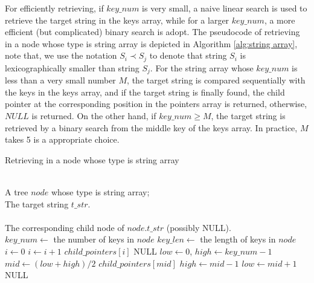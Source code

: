 \documentclass[legalpaper]{article}
\begin{document}
For efficiently retrieving, if $key\_num$ is very small, a naive
linear search is used to retrieve the target string in the keys array,
while for a larger $key\_num$, a more efficient (but complicated)
binary search is adopt.  The pseudocode of retrieving in a node whose
type is string array is depicted in Algorithm \ref{alg:string array},
note that, we use the notation $S_i \prec S_j$ to denote that string
$S_i$ is \textsf{lexicographically smaller} than string $S_j$. For the
string array whose $key\_num$ is less than a very small number $M$,
the target string is compared sequentially with the keys in the keys
array, and if the target string is finally found, the child pointer at
the corresponding position in the pointers array is returned,
otherwise, $NULL$ is returned. On the other hand, if $key\_num \geq
M$, the target string is retrieved by a binary search from the middle
key of the keys array. In practice, $M$ takes 5 is a appropriate
choice.

\begin{algorithm}
  \caption{Retrieving in a node whose type is string array}
  \label{alg:string array}
  \begin{algorithmic}[1]
    \REQUIRE ~~\\
    A tree $node$ whose type is string array; \\
    The target string $t\_str$.\\
    \ENSURE ~~\\
    The corresponding child node of $node.t\_str$ (possibly NULL).\\
    \STATE
    \STATE $key\_num \leftarrow$ the number of keys in $node$
    \STATE $key\_len \leftarrow$ the length of keys in $node$
    \STATE 
    \STATE $i \leftarrow 0$
    \STATE $i \leftarrow i+1$
    \ENDWHILE
    \RETURN $child\_pointers[i]$
    \ELSE
    \RETURN NULL
    \ENDIF
    \ELSE
    \STATE $low \leftarrow 0$, $high \leftarrow key\_num-1$
    \STATE $mid \leftarrow (low+high)/2$
    \RETURN $child\_pointers[mid]$
    \STATE $high \leftarrow mid - 1$
    \ELSE
    \STATE $low \leftarrow mid + 1$
    \ENDIF
    \ENDWHILE
    \RETURN NULL
    \ENDIF
  \end{algorithmic}
\end{algorithm}
\end{document}
